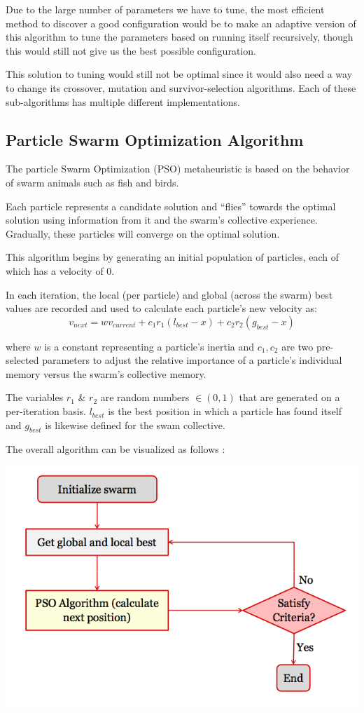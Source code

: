 \documentclass[a4paper]{article}
\begin{document}
Due to the large number of parameters we have to tune, the most efficient method to discover a good configuration would be to make an adaptive version of this algorithm to tune the parameters based on running itself recursively, though this would still not give us the best possible configuration.

This solution to tuning would still not be optimal since it would also need a way to change its crossover, mutation and survivor-selection algorithms. Each of these sub-algorithms has multiple different implementations.

\subsection{Particle Swarm Optimization Algorithm}
The particle Swarm Optimization (PSO) metaheuristic is based on the behavior of swarm animals such as fish and birds.

Each particle represents a candidate solution and ``flies'' towards the optimal solution using information from it and the swarm's collective experience. Gradually, these particles will converge on the optimal solution.

This algorithm begins by generating an initial population of particles, each of which has a velocity of 0.

In each iteration, the local (per particle) and global (across the swarm) best values are recorded and used to calculate each particle's new velocity \cite{ClassicalPSO} as:
$$
v_\mathit{next} = wv_\mathit{current} + c_1r_1(l_\mathit{best} - x) + c_2r_2(g_\mathit{best}-x)
$$

where $w$ is a constant representing a particle's inertia and $c_1, c_2$ are two pre-selected parameters to adjust the relative importance of a particle's individual memory versus the swarm's collective memory.

The variables $r_1$ \& $r_2$ are random numbers $\in (0,1)$ that are generated on a per-iteration basis. $l_\mathit{best}$ is the best position in which a particle has found itself and $g_\mathit{best}$ is likewise defined for the swam collective.

The overall algorithm can be visualized as follows \cite{PSOFigure}:

\includegraphics[width=1\textwidth]{images/PSO.png}
\end{document}

